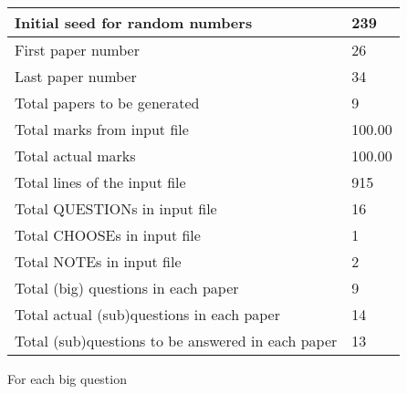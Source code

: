 \documentclass[12pt]{article}
\begin{document}
 \begin{tabular}{|l|l|}
 \hline
 Initial seed for random numbers &        239 \\
\hline
 First paper number &         26 \\
\hline
 Last  paper number &         34 \\
\hline
 Total papers to be generated &          9 \\
\hline
Total marks from input file & 100.00 \\
\hline
Total actual marks & 100.00 \\
\hline
 Total lines of the input file &        915 \\
 \hline
 Total QUESTIONs in input file &         16 \\
\hline
 Total CHOOSEs in input file &          1 \\
\hline
 Total NOTEs in input file &          2 \\
\hline
 Total (big) questions in each paper &          9 \\
\hline
 Total actual (sub)questions in each paper &         14 \\
\hline
 Total (sub)questions to be answered in each paper &         13 \\
\hline
 \end{tabular}
   
   
 \newpage
   
{\LARGE{For each big question}}
   
   
\vspace{0.2in}
   
\end{document}
